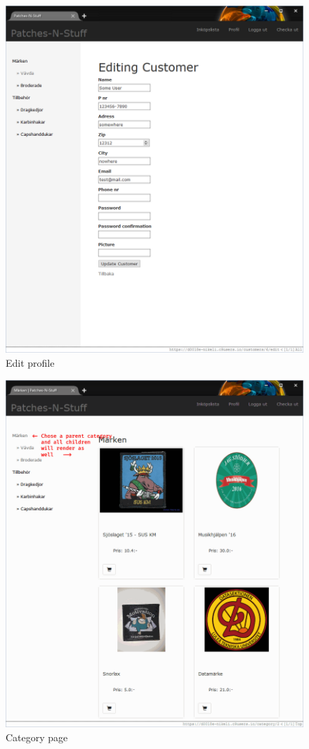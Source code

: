 \documentclass[paper=a4, fontsize=11pt]{report} %
\begin{document}
\begin{itemize}
\begin{figure}
	\includegraphics[width=0.9\paperwidth]{artifacts/stories/6_edit_profile.png}
	\caption{Edit profile}
	\label{fig:edit_profile}
\end{figure}

\begin{figure}
	\includegraphics[width=0.9\paperwidth]{artifacts/stories/7_products.png}
	\caption{Category page}
	\label{fig:products}
\end{figure}


\end{itemize}
\end{document}
